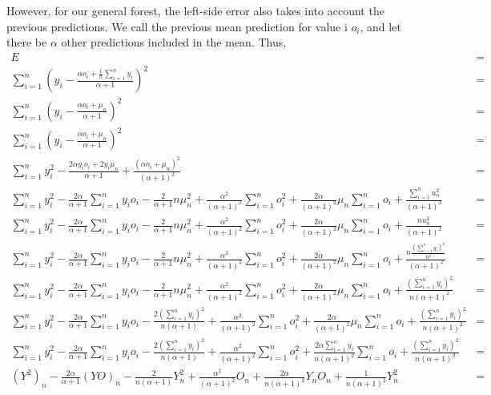 \documentclass{article}
\begin{document}
However, for our general forest, the left-side error also takes into account the
previous predictions. We call the previous mean prediction for value i $o_i$, 
and let there be $\alpha$ other predictions included in the mean. Thus, 
\begin{align*}
    E &= \\
    \sum_{i=1}^n (y_i - \frac{\alpha o_i + \frac1n \sum_{i=1}^n y_i}{\alpha + 1})^2 &= \\
    \sum_{i=1}^n (y_i - \frac{\alpha o_i + \mu_n}{\alpha + 1})^2 &= \\
    \sum_{i=1}^n (y_i - \frac{\alpha o_i + \mu_n}{\alpha + 1})^2 &= \\
    \sum_{i=1}^{n} y_i^2 - \frac{2\alpha y_i o_i + 2y_i \mu_n}{\alpha + 1} + \frac{(\alpha o_i + \mu_n)^2}{(\alpha + 1)^2} &= \\
    \sum_{i=1}^{n} y_i^2 - \frac{2\alpha}{\alpha + 1} \sum_{i=1}^{n} y_i o_i - \frac{2}{\alpha + 1} n\mu_n^2 + \frac{\alpha^2}{(\alpha + 1)^2} \sum_{i=1}^{n} o_i^2 + \frac{2\alpha}{(\alpha + 1)^2} \mu_n \sum_{i=1}^{n} o_i + \frac{\sum_{i=1}^{n} u_n^2}{(\alpha + 1)^2} &= \\
    \sum_{i=1}^{n} y_i^2 - \frac{2\alpha}{\alpha + 1} \sum_{i=1}^{n} y_i o_i - \frac{2}{\alpha + 1} n\mu_n^2 + \frac{\alpha^2}{(\alpha + 1)^2} \sum_{i=1}^{n} o_i^2 + \frac{2\alpha}{(\alpha + 1)^2} \mu_n \sum_{i=1}^{n} o_i + \frac{n u_n^2}{(\alpha + 1)^2} &= \\
    \sum_{i=1}^{n} y_i^2 - \frac{2\alpha}{\alpha + 1} \sum_{i=1}^{n} y_i o_i - \frac{2}{\alpha + 1} n\mu_n^2 + \frac{\alpha^2}{(\alpha + 1)^2} \sum_{i=1}^{n} o_i^2 + \frac{2\alpha}{(\alpha + 1)^2} \mu_n \sum_{i=1}^{n} o_i + \frac{n \frac{(\sum_{i=1}^{n} y_i)^2}{n^2}}{(\alpha + 1)^2} &= \\
    \sum_{i=1}^{n} y_i^2 - \frac{2\alpha}{\alpha + 1} \sum_{i=1}^{n} y_i o_i - \frac{2}{\alpha + 1} n\mu_n^2 + \frac{\alpha^2}{(\alpha + 1)^2} \sum_{i=1}^{n} o_i^2 + \frac{2\alpha}{(\alpha + 1)^2} \mu_n \sum_{i=1}^{n} o_i + \frac{(\sum_{i=1}^{n} y_i)^2}{n(\alpha + 1)^2} &= \\
    \sum_{i=1}^{n} y_i^2 - \frac{2\alpha}{\alpha + 1} \sum_{i=1}^{n} y_i o_i - \frac{2(\sum_{i=1}^{n} y_i)^2}{n(\alpha + 1)} + \frac{\alpha^2}{(\alpha + 1)^2} \sum_{i=1}^{n} o_i^2 + \frac{2\alpha}{(\alpha + 1)^2} \mu_n \sum_{i=1}^{n} o_i + \frac{(\sum_{i=1}^{n} y_i)^2}{n(\alpha + 1)^2} &= \\
    \sum_{i=1}^{n} y_i^2 - \frac{2\alpha}{\alpha + 1} \sum_{i=1}^{n} y_i o_i - \frac{2(\sum_{i=1}^{n} y_i)^2}{n(\alpha + 1)} + \frac{\alpha^2}{(\alpha + 1)^2} \sum_{i=1}^{n} o_i^2 + \frac{2\alpha \sum_{i=1}^n y_i}{n(\alpha + 1)^2} \sum_{i=1}^{n} o_i + \frac{(\sum_{i=1}^{n} y_i)^2}{n(\alpha + 1)^2} &= \\
    (Y^2)_n - \frac{2\alpha}{\alpha + 1}(YO)_n - \frac{2}{n(\alpha + 1)} Y_n^2 + \frac{\alpha^2}{(\alpha + 1)^2} O_n + \frac{2\alpha}{n(\alpha + 1)^2} Y_nO_n + \frac{1}{n(\alpha + 1)^2} Y_n^2 &= 
\end{align*}
\end{document}
